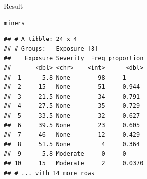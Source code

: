 \documentclass[unknownkeysallowed]{beamer}\usepackage[]{graphicx}\usepackage[]{color}
\makeatletter
\newcommand{\hlopt}[1]{\textcolor[rgb]{0,0,0}{#1}}%
\newcommand{\hlstd}[1]{\textcolor[rgb]{0.345,0.345,0.345}{#1}}%
\newcommand{\hlkwb}[1]{\textcolor[rgb]{0.69,0.353,0.396}{#1}}%
\newcommand{\hlkwc}[1]{\textcolor[rgb]{0.333,0.667,0.333}{#1}}%
\newcommand{\hlkwd}[1]{\textcolor[rgb]{0.737,0.353,0.396}{\textbf{#1}}}%
\newenvironment{kframe}{%
 \def\at@end@of@kframe{}%
 \ifinner\ifhmode%
  \def\at@end@of@kframe{\end{minipage}}%
  \begin{minipage}{\columnwidth}%
 \fi\fi%
 \def\FrameCommand##1{\hskip\@totalleftmargin \hskip-\fboxsep
 \colorbox{shadecolor}{##1}\hskip-\fboxsep
     \hskip-\linewidth \hskip-\@totalleftmargin \hskip\columnwidth}%
 \MakeFramed {\advance\hsize-\width
   \@totalleftmargin\z@ \linewidth\hsize
   \@setminipage}}%
 {\par\unskip\endMakeFramed%
 \at@end@of@kframe}
\newenvironment{knitrout}{}{} %
\makeatother
\begin{document}

\begin{frame}[fragile]{Result}
  
\begin{knitrout}
\color{fgcolor}\begin{kframe}
\begin{alltt}
\hlstd{miners}
\end{alltt}
\begin{verbatim}
## # A tibble: 24 x 4
## # Groups:   Exposure [8]
##    Exposure Severity  Freq proportion
##       <dbl> <chr>    <int>      <dbl>
##  1      5.8 None        98     1     
##  2     15   None        51     0.944 
##  3     21.5 None        34     0.791 
##  4     27.5 None        35     0.729 
##  5     33.5 None        32     0.627 
##  6     39.5 None        23     0.605 
##  7     46   None        12     0.429 
##  8     51.5 None         4     0.364 
##  9      5.8 Moderate     0     0     
## 10     15   Moderate     2     0.0370
## # ... with 14 more rows
\end{verbatim}
\end{kframe}
\end{knitrout}
  
\end{frame}
\end{document}
